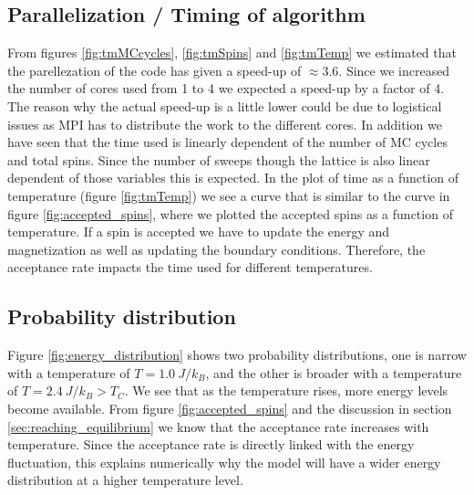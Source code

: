 \documentclass[%
 reprint,
nofootinbib,
aps,
]{revtex4-1}
\begin{document}
\subsection{Parallelization / Timing of algorithm}
From figures \ref{fig:tmMCcycles}, \ref{fig:tmSpins} and \ref{fig:tmTemp} we estimated that the parellezation of the code has given a speed-up of $\approx 3.6$. Since we increased the number of cores used from 1 to 4 we expected a speed-up by a factor of 4. The reason why the actual speed-up is a little lower could be due to logistical issues as MPI has to distribute the work to the different cores. In addition we have seen that the time used is linearly dependent of the number of MC cycles and total spins. Since the number of sweeps though the lattice is also linear dependent of those variables this is expected. In the plot of time as a function of temperature (figure \ref{fig:tmTemp}) we see a curve that is similar to the curve in figure \ref{fig:accepted_spins}, where we plotted the accepted spins as a function of temperature. If a spin is accepted we have to update the energy and magnetization as well as updating the boundary conditions. Therefore, the acceptance rate impacts the time used for different temperatures. 

\subsection{Probability distribution}
Figure \ref{fig:energy_distribution} shows two probability distributions, one is narrow with a temperature of $T = 1.0 \ J/k_B$, and the other is broader with a temperature of $T = 2.4 \ J/k_B > T_C$. We see that as the temperature rises, more energy levels become available. From figure \ref{fig:accepted_spins} and the discussion in section \ref{sec:reaching_equilibrium} we know that the acceptance rate increases with temperature. Since the acceptance rate is directly linked with the energy fluctuation, this explains numerically why the model will have a wider energy distribution at a higher temperature level. 
\end{document}
